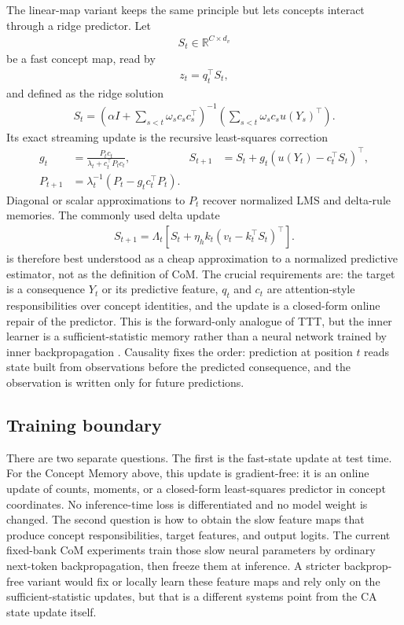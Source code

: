 The linear-map variant keeps the same principle but lets concepts interact through a ridge predictor. Let
\begin{align*}
S_t\in\mathbb{R}^{C\times d_v}
\end{align*}
be a fast concept map, read by
\begin{align*}
z_t=q_t^\top S_t,
\end{align*}
and defined as the ridge solution
\begin{align*}
S_t
=
\left(\alpha I+\sum_{s<t}\omega_s c_s c_s^\top\right)^{-1}
\left(\sum_{s<t}\omega_s c_s u(Y_s)^\top\right).
\end{align*}
Its exact streaming update is the recursive least-squares correction
\begin{align*}
g_t
&=
\frac{P_t c_t}{\lambda_t+c_t^\top P_t c_t},
&
S_{t+1}
&=
S_t+g_t\left(u(Y_t)-c_t^\top S_t\right)^\top,
\\
P_{t+1}
&=
\lambda_t^{-1}\left(P_t-g_t c_t^\top P_t\right).
\end{align*}
Diagonal or scalar approximations to $P_t$ recover normalized LMS and delta-rule memories. The commonly used delta update
\begin{align*}
S_{t+1}
=
\Lambda_t\left[
S_t+\eta_h k_t\left(v_t-k_t^\top S_t\right)^\top
\right].
\end{align*}
is therefore best understood as a cheap approximation to a normalized predictive estimator, not as the definition of CoM. The crucial requirements are: the target is a consequence $Y_t$ or its predictive feature, $q_t$ and $c_t$ are attention-style responsibilities over concept identities, and the update is a closed-form online repair of the predictor. This is the forward-only analogue of TTT, but the inner learner is a sufficient-statistic memory rather than a neural network trained by inner backpropagation \citep{schlag2021linear,sun2025learning,yang2025gated}. Causality fixes the order: prediction at position $t$ reads state built from observations before the predicted consequence, and the observation is written only for future predictions.

\subsection{Training boundary}

There are two separate questions. The first is the fast-state update at test time. For the Concept Memory above, this update is gradient-free: it is an online update of counts, moments, or a closed-form least-squares predictor in concept coordinates. No inference-time loss is differentiated and no model weight is changed. The second question is how to obtain the slow feature maps that produce concept responsibilities, target features, and output logits. The current fixed-bank CoM experiments train those slow neural parameters by ordinary next-token backpropagation, then freeze them at inference. A stricter backprop-free variant would fix or locally learn these feature maps and rely only on the sufficient-statistic updates, but that is a different systems point from the CA state update itself.

